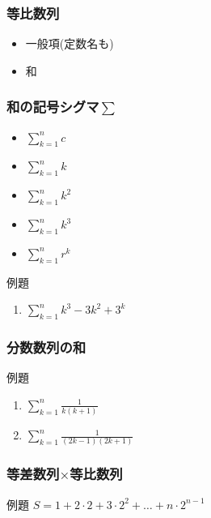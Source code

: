 \documentclass[10pt,dvipdfmx]{jsarticle}
\begin{document}
\subsubsection*{等比数列}
\begin{itemize}
  \item 一般項(定数名も)
  \item 和
\end{itemize}

\subsubsection*{和の記号シグマ$\sum$}
\begin{LARGE}
  \begin{itemize}
    \item $\sum_{k=1}^{n}c$
    \item $\sum_{k=1}^{n}k$
    \item $\sum_{k=1}^{n}k^2$
    \item $\sum_{k=1}^{n}k^3$
    \item $\sum_{k=1}^{n}r^k$
  \end{itemize}
\end{LARGE}

\begin{itembox}[l]{例題}
  \begin{large}
    \begin{enumerate}
      \item $\sum_{k=1}^{n}k^3-3k^2+3^k$
    \end{enumerate}
  \end{large}
\end{itembox}

\subsubsection*{分数数列の和}
\begin{itembox}[l]{例題}
  \begin{LARGE}
    \begin{enumerate}
      \item $\sum_{k=1}^{n}\frac{1}{k(k+1)}$
      \item $\sum_{k=1}^{n}\frac{1}{(2k-1)(2k+1)}$
    \end{enumerate}
  \end{LARGE}
\end{itembox}

\subsubsection*{等差数列$\times$等比数列}
\begin{itembox}[l]{例題}
  $S=1+2\cdot2+3\cdot2^2+\dots+n\cdot2^{n-1}$
  \vspace{20mm}
\end{itembox}
\end{document}
